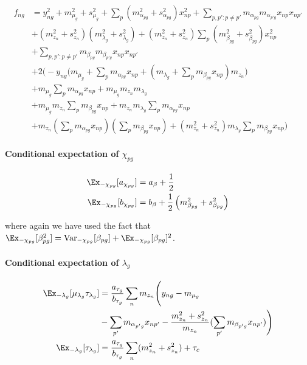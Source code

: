 \begin{equation}
\begin{aligned}
f_{ng}  & =  y_{ng}^2 + m_{\mu_g}^2 + s_{\mu_g}^2 +
 \sum_p (m_{\alpha_{pg}}^2 + s_{\alpha_{pg}}^2) x_{np}^2 + \sum_{p,p':p\neq p'} m_{\alpha_{pg}} m_{\alpha_{p'g}} x_{np} x_{np'} \\
& +  (m_{z_n}^2 + s_{z_n}^2) (m_{\lambda_g}^2 + s_{\lambda_g}^2)
+  (m_{z_n}^2 + s_{z_n}^2)   \sum_p (m_{\beta_{pg}}^2 + s_{\beta_{pg}}^2) x_{np}^2 \\
& + \sum_{p,p':p\neq p'} m_{\beta_{pg}} m_{\beta_{p'g}} x_{np} x_{np'} \\
& + 2 \Big(
-y_{ng} \bigg(m_{\mu_g} + \sum_p m_{\alpha_{pg}} x_{np} + ( m_{\lambda_g} + \sum_p m_{\beta_{pg}} x_{np} ) m_{z_n} \bigg) \\
& + m_{\mu_g} \sum_p m_{\alpha_{pg}} x_{np} + m_{\mu_g} m_{z_n} m_{\lambda_g}  \\
 & + m_{\mu_g} m_{z_n} \sum_p m_{\beta_{pg}} x_{np}
+ m_{z_n} m_{\lambda_g} \sum_p m_{\alpha_{pg}} x_{np} \\
& + m_{z_n} (\sum_p m_{\alpha_{pg}} x_{np})(\sum_p m_{\beta_{pg}} x_{np})
+ (m_{z_n}^2 + s_{z_n}^2) m_{\lambda_g} \sum_p m_{\beta_{pg}} x_{np}
\Big)
\end{aligned}
\end{equation}


\paragraph{Conditional expectation of $\chi_{pg}$}

\begin{equation}
\begin{aligned}
\Ex_{-\chi_{pg}}[a_{\chi_{pg}}] & = a_\beta + \frac{1}{2} \\
\Ex_{-\chi_{pg}}[b_{\chi_{pg}}] & = b_\beta + \frac{1}{2}\left(
m_{\beta_{pg}}^2 + s_{\beta_{pg}}^2 \right)
\end{aligned}
\end{equation}

where again we have used the fact that $\Ex_{-\chi_{pg}}[\beta_{pg}^2] =
\text{Var}_{-\chi_{pg}}[\beta_{pg}] +
\Ex_{-\chi_{pg}}[\beta_{pg}]^2$.

\paragraph{Conditional expectation of $\lambda_g$}

\begin{equation}
\begin{aligned}
\Ex_{-\lambda_g}[\mu_{\lambda_g} \tau_{\lambda_g}] & = \frac{a_{\tau_g}}{b_{\tau_g}}
\sum_n m_{z_n} \Bigg(
y_{ng} - m_{\mu_g} \\
&  - \sum_{p'} m_{\alpha_{p'g}} x_{np'} -
\frac{m_{z_n}^2 + s_{z_n}^2}{m_{z_n}} (\sum_{p'} m_{\beta_{p'g}} x_{np'})
\Bigg) \\
\Ex_{-\lambda_g}[\tau_{\lambda_g}] & = \frac{a_{\tau_g}}{b_{\tau_g}} \sum_n(m_{z_n}^2 + s_{z_n}^2) + \tau_c
\end{aligned}
\end{equation}

